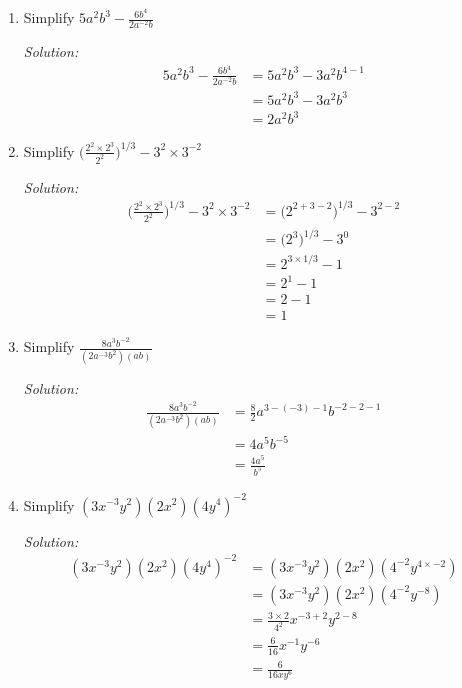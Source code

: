 \documentclass[16pt]{article}
\theoremstyle{remark}
\begin{document}
\begin{enumerate}
\begin{mdframed}[style=TheoremFrame]
\end{mdframed}
\newpage
\item Simplify $\displaystyle{5a^2b^3-\frac{6b^4}{2a^{-2}b}}$
\begin{mdframed}[style=TheoremFrame]
\textit{Solution:}
\begin{align*}
5a^2b^3-\frac{6b^4}{2a^{-2}b} &= 5a^2b^3- 3 a^2 b^{4-1}\\
&= 5a^2b^3- 3 a^2 b^{3}\\
&= 2 a^2 b^3
\end{align*}
\end{mdframed}
\item Simplify $\displaystyle{\bigg(\frac{2^2 \times 2^3}{2^2}\bigg)^{1/3} - 3^2\times 3^{-2}}$
\begin{mdframed}[style=TheoremFrame]
\textit{Solution:}
\begin{align*}
\bigg(\frac{2^2 \times 2^3}{2^2}\bigg)^{1/3} - 3^2\times 3^{-2} &= \big(2^{2+3-2}\big)^{1/3} - 3^{2-2}\\
&= \big(2^{3}\big)^{1/3} - 3^{0}\\
&= 2^{3\times 1/3} - 1\\
&= 2^1 - 1\\
&= 2-1\\
&= 1
\end{align*}
\end{mdframed}
\item Simplify $\displaystyle{\frac{8a^3b^{-2}}{(2a^{-3}b^2)(ab)}}$
\begin{mdframed}[style=TheoremFrame]
\textit{Solution:}
\begin{align*}
\frac{8a^3b^{-2}}{(2a^{-3}b^2)(ab)} &= \frac{8}{2} a^{3 - (-3)-1} b^{-2-2-1}\\
&= 4 a^5 b^{-5}\\
&= \frac{4a^5}{b^5} 
\end{align*}
\end{mdframed}
\newpage
\item Simplify $\displaystyle{(3x^{-3}y^2)(2x^2)(4y^4)^{-2}}$
\begin{mdframed}[style=TheoremFrame]
\textit{Solution:}
\begin{align*}
(3x^{-3}y^2)(2x^2)(4y^4)^{-2} &= (3x^{-3}y^2)(2x^2)(4^{-2}y^{4\times -2})\\
&= (3x^{-3}y^2)(2x^2)(4^{-2}y^{-8})\\
&= \frac{3\times2}{4^2} x^{-3+2}y^{2-8}\\
&= \frac{6}{16} x^{-1}y^{-6}\\
&= \frac{6}{16xy^6}
\end{align*}
\end{mdframed}

\end{enumerate}
\end{document}
